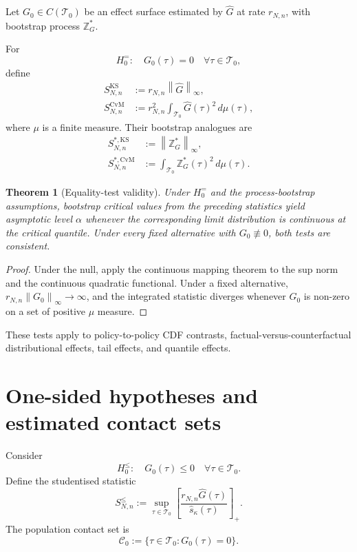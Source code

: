 \documentclass[11pt]{article}
\newtheorem{theorem}[assumption]{Theorem}
\theoremstyle{remark}
\newcommand{\cT}{\mathcal T}
\newcommand{\cC}{\mathcal C}
\newcommand{\norm}[1]{\left\lVert #1\right\rVert}
\begin{document}
Let $G_0\in C(\cT_0)$ be an effect surface estimated by $\widehat G$ at rate $r_{N,n}$, with bootstrap process $\mathbb Z_G^*$.

For
\[
 H_0^=:\quad G_0(\tau)=0
 \quad\forall\tau\in\cT_0,
\]
define
\begin{align}
 S_{N,n}^{\mathrm{KS}}
 &:=
 r_{N,n}\norm{\widehat G}_\infty,\label{eq:KS}\\
 S_{N,n}^{\mathrm{CvM}}
 &:=
 r_{N,n}^2
 \int_{\cT_0}\widehat G(\tau)^2\,d\mu(\tau),\label{eq:CvM}
\end{align}
where $\mu$ is a finite measure. Their bootstrap analogues are
\begin{align}
 S_{N,n}^{*,\mathrm{KS}}
 &:=
 \norm{\mathbb Z_G^*}_\infty,\\
 S_{N,n}^{*,\mathrm{CvM}}
 &:=
 \int_{\cT_0}\mathbb Z_G^*(\tau)^2\,d\mu(\tau).
\end{align}

\begin{theorem}[Equality-test validity]\label{thm:equality}
Under $H_0^=$ and the process-bootstrap assumptions, bootstrap critical values from the preceding statistics yield asymptotic level $\alpha$ whenever the corresponding limit distribution is continuous at the critical quantile. Under every fixed alternative with $G_0\not\equiv0$, both tests are consistent.
\end{theorem}

\begin{proof}
Under the null, apply the continuous mapping theorem to the sup norm and the continuous quadratic functional. Under a fixed alternative, $r_{N,n}\norm{G_0}_\infty\to\infty$, and the integrated statistic diverges whenever $G_0$ is non-zero on a set of positive $\mu$ measure.
\end{proof}

These tests apply to policy-to-policy CDF contrasts, factual-versus-counterfactual distributional effects, tail effects, and quantile effects.

\section{One-sided hypotheses and estimated contact sets}

Consider
\begin{equation}\label{eq:null-one}
 H_0^\le:\quad G_0(\tau)\le0
 \quad\forall\tau\in\cT_0.
\end{equation}
Define the studentised statistic
\begin{equation}\label{eq:one-stat}
 S_{N,n}^\le
 :=
 \sup_{\tau\in\cT_0}
 \left[
 \frac{r_{N,n}\widehat G(\tau)}
 {\widehat s_\kappa(\tau)}
 \right]_+.
\end{equation}
The population contact set is
\[
 \cC_0:=\{\tau\in\cT_0:G_0(\tau)=0\}.
\]
\end{document}
